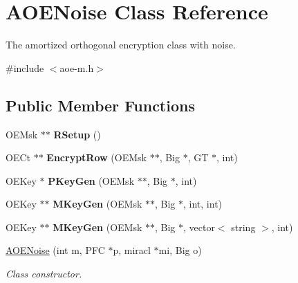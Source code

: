 \hypertarget{classAOENoise}{}\section{A\+O\+E\+Noise Class Reference}
\label{classAOENoise}


The amortized orthogonal encryption class with noise.  




{\ttfamily \#include $<$aoe-\/m.\+h$>$}

\subsection*{Public Member Functions}
\begin{DoxyCompactItemize}
\item 
O\+E\+Msk $\ast$$\ast$ {\bfseries R\+Setup} ()\hypertarget{classAOENoise_aace84ea252612135b75af802aabd48d0}{}\label{classAOENoise_aace84ea252612135b75af802aabd48d0}

\item 
O\+E\+Ct $\ast$$\ast$ {\bfseries Encrypt\+Row} (O\+E\+Msk $\ast$$\ast$, Big $\ast$, GT $\ast$, int)\hypertarget{classAOENoise_acbe578fc5c1ceb7228615bfb01819eb7}{}\label{classAOENoise_acbe578fc5c1ceb7228615bfb01819eb7}

\item 
O\+E\+Key $\ast$ {\bfseries P\+Key\+Gen} (O\+E\+Msk $\ast$$\ast$, Big $\ast$, int)\hypertarget{classAOENoise_a17522dc5432669863eadfba8e1f297ef}{}\label{classAOENoise_a17522dc5432669863eadfba8e1f297ef}

\item 
O\+E\+Key $\ast$$\ast$ {\bfseries M\+Key\+Gen} (O\+E\+Msk $\ast$$\ast$, Big $\ast$, int, int)\hypertarget{classAOENoise_a51c5548b81f351fe80afacacdc6716c4}{}\label{classAOENoise_a51c5548b81f351fe80afacacdc6716c4}

\item 
O\+E\+Key $\ast$$\ast$ {\bfseries M\+Key\+Gen} (O\+E\+Msk $\ast$$\ast$, Big $\ast$, vector$<$ string $>$, int)\hypertarget{classAOENoise_a2e29a95c839442e2e4440becab6b7384}{}\label{classAOENoise_a2e29a95c839442e2e4440becab6b7384}

\item 
\hyperlink{classAOENoise_a09b41dc882e04d61e588da49d06198a9}{A\+O\+E\+Noise} (int m, P\+FC $\ast$p, miracl $\ast$mi, Big o)
\begin{DoxyCompactList}\small\item\em Class constructor. \end{DoxyCompactList}\end{DoxyCompactItemize}
